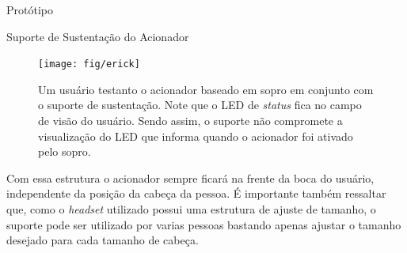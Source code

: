 \begin{chapter}{Protótipo}
\begin{section}{Suporte de Sustentação do Acionador}
\begin{figure}[!h]
	\centering
	\begin{minipage}[c]{\textwidth}
	\centering
	\texttt{[image: fig/erick]}
	\caption{Um usuário testanto o acionador baseado em sopro em conjunto com o
suporte de sustentação. Note que o LED de \textit{status} fica no campo de visão
do usuário. Sendo assim, o suporte não compromete a visualização do LED que
informa quando o acionador foi ativado pelo sopro.}
	\label{fig:suporte}
	\end{minipage}
\end{figure}

Com essa estrutura o acionador sempre ficará na frente da boca do usuário,
independente da posição da cabeça da pessoa. É importante também ressaltar que,
como o \textit{headset} utilizado possui uma estrutura de ajuste de tamanho, o
suporte pode ser utilizado por varias pessoas bastando apenas ajustar o tamanho
desejado para cada tamanho de cabeça. 

\end{section}
\end{chapter}
